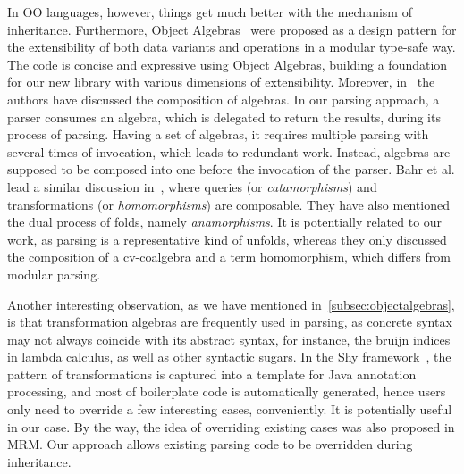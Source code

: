 In OO languages, however, things get much better with the mechanism of
inheritance. Furthermore, Object Algebras~\cite{Oliveira2012} were
proposed as a design pattern for the extensibility of both data
variants and operations in a modular type-safe way. The code is
concise and expressive using Object Algebras, building a foundation
for our new library with various dimensions of extensibility.
Moreover, in~\cite{Oliveira2012} the authors have discussed the
composition of algebras. In our parsing approach, a parser consumes an
algebra, which is delegated to return the results, during its process
of parsing. Having a set of algebras, it requires multiple parsing
with several times of invocation, which leads to redundant work.
Instead, algebras are supposed to be composed into one before the
invocation of the parser. Bahr et al. lead a similar discussion
in~\cite{Bahr2011}, where queries (or \textit{catamorphisms}) and
transformations (or \textit{homomorphisms}) are composable. They have
also mentioned the dual process of folds, namely
\textit{anamorphisms}. It is potentially related to our work, as
parsing is a representative kind of unfolds, whereas they only
discussed the composition of a cv-coalgebra and a term homomorphism,
which differs from modular parsing.

Another interesting observation, as we have mentioned
in~\ref{subsec:objectalgebras}, is that transformation algebras are
frequently used in parsing, as concrete syntax may not always coincide
with its abstract syntax, for instance, the bruijn indices in lambda
calculus, as well as other syntactic sugars. In the Shy
framework~\cite{Zhang2015}, the pattern of transformations is captured
into a template for Java annotation processing, and most of
boilerplate code is automatically generated, hence users only need to
override a few interesting cases, conveniently. It is potentially useful
in our case. By the way, the idea of overriding
existing cases was also proposed in MRM. Our approach allows existing parsing
code to be overridden during inheritance.